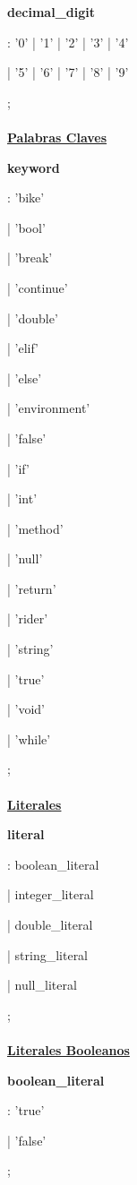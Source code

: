 \documentclass[12pt, letterpaper,spanish]{article}
\theoremstyle{definition}
\theoremstyle{remark}
\begin{document}
	\textbf{decimal\_digit}\par
	: '0' | '1' | '2' | '3' | '4'\par 
	| '5' | '6' | '7' | '8' | '9'\par
	; \\ \\
	
	\underline{\textbf{Palabras Claves}}\par
	\textbf{keyword}\par        
	: 'bike'\par     
	| 'bool'\par
	| 'break'\par
	| 'continue'\par 
	| 'double'\par
	| 'elif'\par
	| 'else'\par
	| 'environment'\par
	| 'false'\par
	| 'if'\par
	| 'int'\par
	| 'method'\par
	| 'null'\par
	| 'return'\par
	| 'rider'\par
	| 'string'\par
	| 'true'\par
	| 'void'\par
	| 'while'\par
	; \\ \\
	
	\underline{\textbf{Literales}}\par
	\textbf{literal}\par
	: boolean\_literal\par
	| integer\_literal\par
	| double\_literal\par
	| string\_literal\par
	| null\_literal\par
	; \\ \\
	
	\underline{\textbf{Literales Booleanos}}\par
	\textbf{boolean\_literal}\par
	: 'true'\par
	| 'false'\par
	; \\ \\
	
\end{document}

